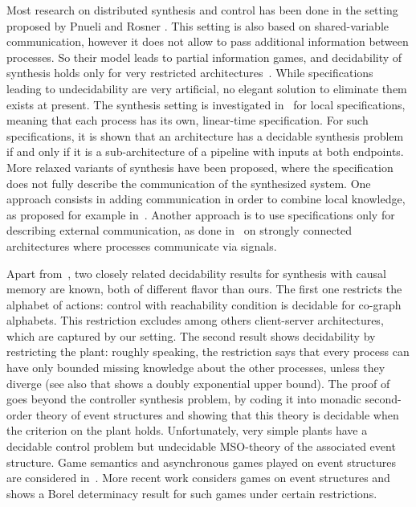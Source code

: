 \documentclass[10pt,a4paper]{article}
\begin{document}
Most research on distributed synthesis and control has been done in
the setting proposed by Pnueli and Rosner \cite{PR90}. This setting is also based
on shared-variable communication, however it does not allow
to pass additional information between processes. So their model leads
to partial information games, and decidability of synthesis holds
only for very restricted
architectures~\cite{KV01,MadThiag01,FinSch05}. While specifications leading to
undecidability are very artificial, no elegant solution to eliminate
them exists at present.
The synthesis setting is investigated
in~\cite{MadThiag01} for local specifications, meaning that each
process has its own, linear-time specification. For such
specifications, it is shown that an architecture has a decidable
synthesis problem if and only if it is a sub-architecture of a
pipeline with inputs at both endpoints. More relaxed variants of synthesis have been proposed, where the
specification does not fully describe the communication of the
synthesized system. One approach consists in adding communication in
order to combine local knowledge, as proposed for example
in~\cite{gpq12}.  Another approach is to use specifications only for
describing external communication, as done in~\cite{gs13tocl} on
strongly connected architectures where processes communicate via
signals.

Apart from~\cite{GGMW13}, two closely related decidability results for
synthesis with causal memory are known, both of different flavor than
ours. The first one \cite{GLZ04} restricts the alphabet of actions:
control with reachability condition is decidable for co-graph
alphabets. This restriction excludes among others client-server
architectures, which are captured by our setting. The second result
\cite{MTY05} shows decidability by restricting the plant: roughly
speaking, the restriction says that every process can have only
bounded missing knowledge about the other processes, unless they
diverge (see also \cite{ms13} that shows a doubly exponential upper
bound). The proof of \cite{MTY05} goes beyond the controller synthesis
problem, by coding it into monadic second-order theory of event
structures and showing that this theory is decidable when the
criterion on the plant holds. Unfortunately, very simple plants have a
decidable control problem but undecidable MSO-theory of the associated
event structure. Game semantics and
asynchronous games played on event structures are considered in~\cite{mel06}. More recent work
\cite{gw13} considers games on event structures and shows a Borel
determinacy result for such games under certain restrictions. 
\end{document}
